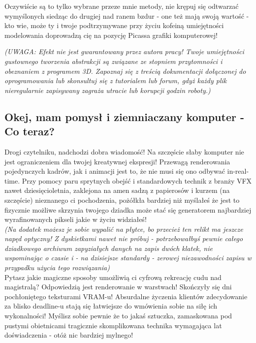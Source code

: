 \newpage
Oczywiście są to tylko wybrane przeze mnie metody, nie krępuj się odtwarzać wymyślonych siedząc do drugiej nad ranem bzdur - one też mają swoją wartość - kto wie, może ty i twoje podtrzymywane przy życiu kofeiną umiejętności modelowania doprowadzą cię na pozycję Picassa grafiki komputerowej! \begin{center}\scriptsize\textit{(UWAGA: Efekt nie jest gwarantowany przez autora pracy! Twoje umiejętności gustownego tworzenia abstrakcji są związane ze stopniem przytomności i obeznaniem z programem 3D. Zapoznaj się z treścią dokumentacji dołączonej do oprogramowania lub skonsultuj się z tutorialem lub forum, gdyż każdy plik nieregularnie zapisywany zagraża utracie lub korupcji godzin roboty.)}\end{center}

\subsection{\texorpdfstring{Okej, mam pomysł i ziemniaczany komputer - \\Co teraz?}{}}
Drogi czytelniku, nadchodzi dobra wiadomość! Na szczęście słaby komputer nie jest ograniczeniem dla twojej kreatywnej ekspresji! Przewagą renderowania pojedynczych kadrów, jak i animacji jest to, że nie musi się ono odbywać in-real-time. Przy pomocy paru sprytnych obejść i standardowych technik z branży VFX nawet dziesięcioletnia, zaklejona na amen sadzą z papierosów i kurzem (na szczęście) nieznanego ci pochodzenia, pożółkła bardziej niż myślałeś że jest to fizycznie możliwe skrzynia twojego dziadka może stać się generatorem najbardziej wyrafinowanych pikseli jakie w życiu widziałeś! \\\textit{(Na dodatek możesz je sobie wypalić na płytce, bo przecież ten relikt ma jeszcze napęd optyczny! Z dyskietkami nawet nie próbuj - potrzebowałbyś pewnie całego dziadkowego archiwum zapyziałych danych na zapis dwóch klatek, nie wspominając o czasie i - na dzisiejsze standardy - zerowej niezawodności zapisu w przypadku użycia tego rozwiązania)}\vspace{1ex} \\ 
Pytasz jakie magiczne sposoby umożliwią ci cyfrową rekreację cudu nad magistralą? Odpowiedzią jest renderowanie w warstwach! Skończyły się dni pochłoniętego teksturami VRAM-u! Absurdalne życzenia klientów zdecydowanie za blisko deadline-u stają się łatwiejsze do wmówienia sobie na siłę ich wykonalności! Myślisz sobie pewnie że to jakaś sztuczka, zamaskowana pod pustymi obietnicami tragicznie skomplikowana technika wymagająca lat doświadczenia - otóż nic bardziej mylnego!\\
